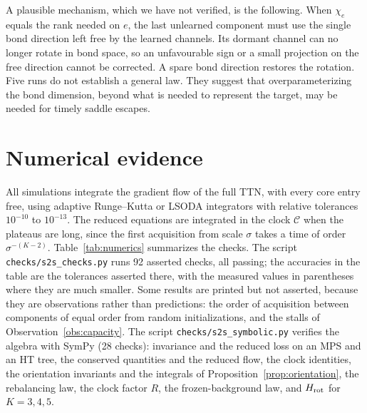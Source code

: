\documentclass[11pt]{article}
\newcommand{\Clk}{\mathcal{C}}
\theoremstyle{definition}
\numberwithin{equation}{section}
\begin{document}
A plausible mechanism, which we have not verified, is the following. When $\chi_e$ equals the rank needed on $e$, the last unlearned component must use the single bond direction left free by the learned channels. Its dormant channel can no longer rotate in bond space, so an unfavourable sign or a small projection on the free direction cannot be corrected. A spare bond direction restores the rotation. Five runs do not establish a general law. They suggest that overparameterizing the bond dimension, beyond what is needed to represent the target, may be needed for timely saddle escapes.

\section{Numerical evidence}\label{sec:numerics}

All simulations integrate the gradient flow of the full TTN, with every core entry free, using adaptive Runge--Kutta or LSODA integrators with relative tolerances $10^{-10}$ to $10^{-13}$. The reduced equations are integrated in the clock $\Clk$ when the plateaus are long, since the first acquisition from scale $\sigma$ takes a time of order $\sigma^{-(K-2)}$. Table~\ref{tab:numerics} summarizes the checks. The script \texttt{checks/s2s\_checks.py} runs 92 asserted checks, all passing; the accuracies in the table are the tolerances asserted there, with the measured values in parentheses where they are much smaller. Some results are printed but not asserted, because they are observations rather than predictions: the order of acquisition between components of equal order from random initializations, and the stalls of Observation~\ref{obs:capacity}. The script \texttt{checks/s2s\_symbolic.py} verifies the algebra with SymPy (28 checks): invariance and the reduced loss on an MPS and an HT tree, the conserved quantities and the reduced flow, the clock identities, the orientation invariants and the integrals of Proposition~\ref{prop:orientation}, the rebalancing law, the clock factor $R$, the frozen-background law, and $H_{\rm rot}$ for $K=3,4,5$.
\end{document}
